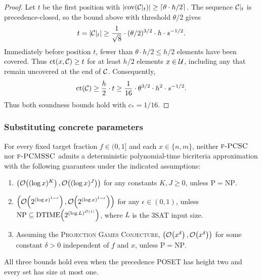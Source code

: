 \begin{proof}
    Let $t$ be the first position with $\mathopen{}\left| \operatorname{cov}\mathopen{}\left( \mathcal{C}|_{t} \right) \right|\geq\lceil\theta\cdot h/2\rceil$. The sequence $\mathcal{C}|_{t}$ is precedence-closed, so the bound above with threshold $\theta/2$ gives
    \[
        t=\mathopen{}\left| \mathcal{C}|_{t} \right|\geq\frac{1}{\sqrt8}\cdot(\theta/2)^{3/2}\cdot h\cdot s^{-1/2}.
    \]
    Immediately before position $t$, fewer than $\theta\cdot h/2\leq h/2$ elements have been covered. Thus $\operatorname{ct}\mathopen{}\left( x,\mathcal{C} \right)\geq t$ for at least $h/2$ elements $x\in\mathcal{U}$, including any that remain uncovered at the end of $\mathcal{C}$. Consequently,
    \[
        \operatorname{ct}\mathopen{}\left( \mathcal{C} \right)\geq\frac{h}{2}\cdot t
        \geq\frac{1}{16}\cdot\theta^{3/2}\cdot h^2\cdot s^{-1/2}.
    \]
    Thus both soundness bounds hold with $c_*=1/16$.
\end{proof}

\subsubsection{Substituting concrete parameters}
\begin{theorem}\label{thm:label-cover-hardness}
    For every fixed target fraction $f\in(0,1]$ and each $x\in\{n,m\}$, neither $\textup{\textsc{f-PCSC}}$ nor $\textup{\textsc{f-PCMSSC}}$ admits a deterministic polynomial-time bicriteria approximation with the following guarantees under the indicated assumptions:
    \begin{enumerate}
        \item\label{item:label-cover-polylog} $\mathopen{}\left( \mathcal{O}\mathopen{}\left( (\log x)^K \right),\mathcal{O}\mathopen{}\left( (\log x)^J \right) \right)$ for any constants $K,J\geq0$, unless $\mathrm{P}=\mathrm{NP}$.
        \item\label{item:label-cover-subpolynomial} $\mathopen{}\left( \mathcal{O}\mathopen{}\left( 2^{(\log x)^{1-\epsilon}} \right),\mathcal{O}\mathopen{}\left( 2^{(\log x)^{1-\epsilon}} \right) \right)$ for any $\epsilon\in(0,1)$, unless $\mathrm{NP}\subseteq\mathrm{DTIME}\mathopen{}\left( 2^{(\log L)^{\mathcal{O}(1)}} \right)$, where $L$ is the 3SAT input size.
        \item\label{item:label-cover-polynomial} Assuming the \textup{\textsc{Projection Games Conjecture}}, $\mathopen{}\left( \mathcal{O}\mathopen{}\left( x^\delta \right),\mathcal{O}\mathopen{}\left( x^\delta \right) \right)$ for some constant $\delta>0$ independent of $f$ and $x$, unless $\mathrm{P}=\mathrm{NP}$.
    \end{enumerate}
    All three bounds hold even when the precedence POSET has height two and every set has size at most one.
\end{theorem}
